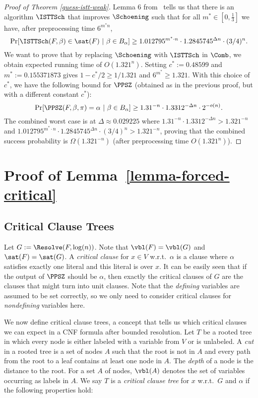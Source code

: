 \begin{proof}[Proof of Theorem \ref{guess-istt-weak}]
Lemma 6 from~\cite{istt10} tells us that there is an algorithm $\ISTTSch$ that improves $\Schoening$ such that for all $m^*\in [0,\frac{1}{3}]$ we have, after preprocessing time $6^{m^* n}$,
\[
\Pr[\ISTTSch(F,\beta)\in\sat(F) \ | \ \beta \in B_\alpha]
\geq 1.012795^{m^* \cdot n}\cdot 1.2845745^{\Delta n}\cdot (3/4)^n.
\]
We want to prove that by replacing $\Schoening$ with $\ISTTSch$ in $\Comb$, we obtain expected running time of
  $O(1.321^{n})$. Setting $c^* := 0.48599$ and $m^*:=0.155371873$ gives $1-c^*/2\geq 1/1.321$ and $6^{m^*}\geq 1.321$. With this choice of $c^*$, we have the following bound for $\PPSZ$ (obtained as in the previous proof, but with a different constant $c^*$):
\[
\Pr[\PPSZ(F,\beta,\pi)=\alpha \ | \ \beta \in B_\alpha]
\geq 1.31^{-n} \cdot 1.3312^{-\Delta n} \cdot 2^{-o(n)}. 
\]
The combined worst case is at $\Delta\approx 0.029225$ where
$1.31^{-n} \cdot 1.3312^{-\Delta n}> 1.321^{-n}$ and
$1.012795^{m^*\cdot n}\cdot 1.2845745^{\Delta n}\cdot (3/4)^n> 1.321^{-n}$, proving that the combined success probability is $\Omega(1.321^{-n})$ (after preprocessing time $O(1.321^n)$).
\end{proof}

\section{Proof of Lemma~\ref{lemma-forced-critical}}
\label{section-prooflemma8}
\subsection{Critical Clause Trees}
 Let
$G:=\Resolve(F,\log(n))$. Note that $\vbl(F)=\vbl(G)$ and
$\sat(F)=\sat(G)$.
A \emph{critical clause} for $x\in V$ w.r.t.\  $\alpha$ is a clause where $\alpha$ satisfies exactly one literal and this literal is over $x$. It can be easily seen that if the output of $\PPSZ$ should be $\alpha$, then exactly the critical clauses of $G$ are the clauses that might turn into unit clauses. Note that the \emph{defining} variables are assumed to be set correctly, so we only need to consider critical clauses for \emph{nondefining} variables here.

We now define critical clause trees, a concept that tells us which critical clauses we can expect in a CNF formula after bounded resolution. Let $T$ be a rooted tree in which every node is either labeled with a variable from $V$ or is unlabeled. A \emph{cut} in a rooted tree is a set of nodes $A$ such that the root is not in $A$ and every path from the root to a leaf contains at least one node in $A$. The \emph{depth} of a node is the distance to the root.  
For a set $A$ of nodes, $\vbl(A)$ denotes the set of variables occurring as labels in $A$.
We say $T$ is a \emph{critical clause tree} for $x$ w.r.t.\ $G$ and $\alpha$ if the following properties hold:

